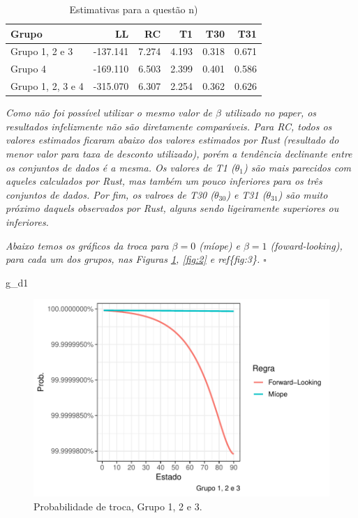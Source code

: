 \documentclass[12pt,a4paper]{article}
\newenvironment{Shaded}{\begin{snugshade}}{\end{snugshade}}
\newcommand{\NormalTok}[1]{#1}
\begin{document}
\begin{table}[ht]
\centering
\begin{tabular}{lrrrrr}
  \hline
Grupo & LL & RC & T1 & T30 & T31 \\ 
  \hline
Grupo 1, 2 e 3 & -137.141 & 7.274 & 4.193 & 0.318 & 0.671 \\ 
  Grupo 4 & -169.110 & 6.503 & 2.399 & 0.401 & 0.586 \\ 
  Grupo 1, 2, 3 e 4 & -315.070 & 6.307 & 2.254 & 0.362 & 0.626 \\ 
   \hline
\end{tabular}
\caption{Estimativas para a questão n)} 
\label{tab:2}
\end{table}

\emph{Como não foi possível utilizar o mesmo valor de \(\beta\)
utilizado no paper, os resultados infelizmente não são diretamente
comparáveis. Para RC, todos os valores estimados ficaram abaixo dos
valores estimados por Rust (resultado do menor valor para taxa de
desconto utilizado), porém a tendência declinante entre os conjuntos de
dados é a mesma. Os valores de T1 (\(\theta_1\)) são mais parecidos com
aqueles calculados por Rust, mas também um pouco inferiores para os três
conjuntos de dados. Por fim, os valroes de T30 (\(\theta_{30}\)) e T31
(\(\theta_{31}\)) são muito próximo daquels observados por Rust, alguns
sendo ligeiramente superiores ou inferiores.}

\emph{Abaixo temos os gráficos da troca para \(\beta = 0\) (míope) e
\(\beta =1\) (foward-looking), para cada um dos grupos, nas Figuras
\ref{fig:1}, \ref{fig:2} e ref\{fig:3\}. \(\square\)}

\begin{Shaded}
\begin{Highlighting}[]
\NormalTok{g_d1}
\end{Highlighting}
\end{Shaded}

\begin{figure}
\centering
\includegraphics{Lista_econometria_II_files/figure-latex/unnamed-chunk-5-1.pdf}
\caption{Probabilidade de troca, Grupo 1, 2 e 3. \label{fig:1}}
\end{figure}
\end{document}

